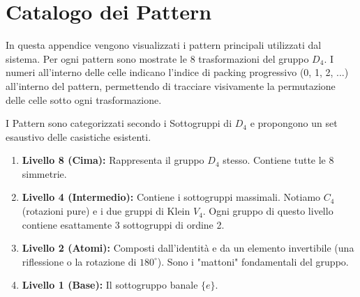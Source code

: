 \ExplSyntaxOff

\newcommand{\drawSubfigure}[4]{%
  \begin{subfigure}[b]{0.23\textwidth}
    \centering
    \scalebox{0.45}{
      \begin{othelloboard}{1}
        \expandafter\formatPositions\expandafter{#4}%
      \end{othelloboard}
    }
    \caption{$T_{#1}$ : #2 \hexmask{#3}}
  \end{subfigure}
}


\section{Catalogo dei Pattern}

In questa appendice vengono visualizzati i pattern principali utilizzati dal sistema. Per ogni pattern sono mostrate le 8 trasformazioni del gruppo $D_4$. I numeri all'interno delle celle indicano l'indice di packing progressivo (0, 1, 2, ...) all'interno del pattern, permettendo di tracciare visivamente la permutazione delle celle sotto ogni trasformazione.

I Pattern sono categorizzati secondo i Sottogruppi di $D_4$ e propongono un set esaustivo delle casistiche esistenti.

\begin{enumerate}
  \item \textbf{Livello 8 (Cima):} Rappresenta il gruppo $D_4$ stesso. Contiene tutte le 8 simmetrie.
  \item \textbf{Livello 4 (Intermedio):} Contiene i sottogruppi massimali. Notiamo $C_4$ (rotazioni pure) e i due gruppi di Klein $V_4$. Ogni gruppo di questo livello contiene esattamente 3 sottogruppi di ordine 2.
  \item \textbf{Livello 2 (Atomi):} Composti dall'identità e da un elemento invertibile (una riflessione o la rotazione di $180^\circ$). Sono i "mattoni" fondamentali del gruppo.
  \item \textbf{Livello 1 (Base):} Il sottogruppo banale $\{e\}$.
\end{enumerate}

